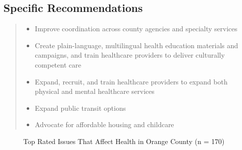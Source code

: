 \documentclass[
  english,
  letterpaper,
]{report}
\begin{document}
\subsection{Specific Recommendations}\label{specific-recommendations-1}

\begin{quote}
\begin{itemize}
\item
  Improve coordination across county agencies and specialty services
\item
  Create plain-language, multilingual health education materials and
  campaigns, and train healthcare providers to deliver culturally
  competent care
\item
  Expand, recruit, and train healthcare providers to expand both
  physical and mental healthcare services
\item
  Expand public transit options
\item
  Advocate for affordable housing and childcare
\end{itemize}
\end{quote}

\begin{figure}


\caption{\label{fig-oc-affect-health}Top Rated Issues That Affect Health
in Orange County (n = 170)}

\end{figure}%
\end{document}
